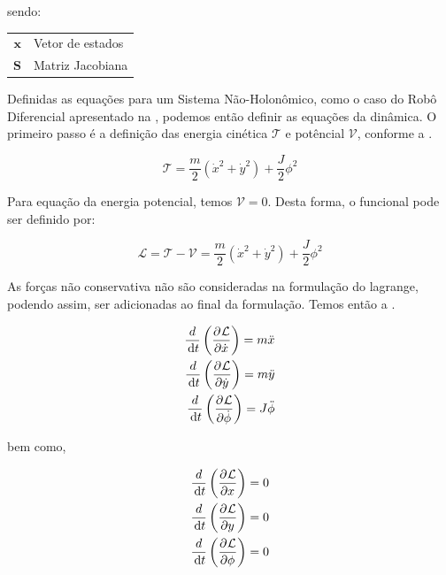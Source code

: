 \noindent sendo:
\begin{tabular}{ r | l }
    $\mathbf{x}$ & Vetor de estados \\
    $\mathbf{S}$ & Matriz Jacobiana \\
\end{tabular}

Definidas as equações para um Sistema Não-Holonômico, como o caso do Robô Diferencial apresentado na , podemos então definir 
as equações da dinâmica. O primeiro passo é a definição das energia cinética $\mathcal{T}$ e potêncial $\mathcal{V}$, conforme a .

\begin{equation}
    \mathcal{T} = \frac{m}{2}\left(\dot{x}^2+\dot{y}^2\right)+ \frac{J}{2}\phi^2
    \label{eq:diffcardin}
\end{equation}

Para equação da energia potencial, temos $\mathcal{V} = 0$. Desta forma, o funcional pode ser definido por:

\begin{equation}
    \mathcal{L} = \mathcal{T} - \mathcal{V} = \frac{m}{2}\left(\dot{x}^2+\dot{y}^2\right)+ \frac{J}{2}\phi^2
    \label{eq:diffcardin2}
\end{equation}

As forças não conservativa não são consideradas na formulação do lagrange, podendo assim, ser adicionadas ao final da formulação. Temos então a .

\begin{equation}
    \begin{split}
        \frac{d}{\df{t}}\left( \parcial{}{\mathcal{L}}{\dot{x}}\right) = m\ddot{x} \\
        \frac{d}{\df{t}}\left( \parcial{}{\mathcal{L}}{\dot{y}}\right) = m\ddot{y} \\
        \frac{d}{\df{t}}\left( \parcial{}{\mathcal{L}}{\dot{\phi}}\right) = J\ddot{\phi} 
    \end{split}
    \label{eq:diffcardin3}
\end{equation}


\noindent bem como,

\begin{equation}
    \begin{split}
        \frac{d}{\df{t}}\left( \parcial{}{\mathcal{L}}{x}\right) = 0 \\
        \frac{d}{\df{t}}\left( \parcial{}{\mathcal{L}}{y}\right) = 0 \\
        \frac{d}{\df{t}}\left( \parcial{}{\mathcal{L}}{\phi}\right) = 0
    \end{split}
    \label{eq:diffcardin4}
\end{equation}

